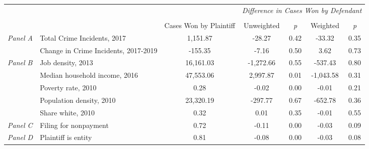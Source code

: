 \begin{tabular}{llccccc}
\toprule
 &  & \textit{} & \multicolumn{4}{c}{\textit{Difference in Cases Won by Defendant}} \\
\cline{4-7}
\\
 &  & Cases Won by Plaintiff & Unweighted & \emph{p} & Weighted & \emph{p} \\
\midrule
\multirow[c]{2}{.75cm}{\textit{Panel A}} & Total Crime Incidents, 2017 & 1,151.87 & -28.27 & 0.42 & -33.32 & 0.35 \\
 & Change in Crime Incidents, 2017-2019 & -155.35 & -7.16 & 0.50 & 3.62 & 0.73 \\
\cline{1-7}
\multirow[c]{5}{.75cm}{\textit{Panel B}} & Job density, 2013 & 16,161.03 & -1,272.66 & 0.55 & -537.43 & 0.80 \\
 & Median household income, 2016 & 47,553.06 & 2,997.87 & 0.01 & -1,043.58 & 0.31 \\
 & Poverty rate, 2010 & 0.28 & -0.02 & 0.00 & -0.01 & 0.21 \\
 & Population density, 2010 & 23,320.19 & -297.77 & 0.67 & -652.78 & 0.36 \\
 & Share white, 2010 & 0.32 & 0.01 & 0.35 & -0.01 & 0.55 \\
\cline{1-7}
\textit{Panel C} & Filing for nonpayment & 0.72 & -0.11 & 0.00 & -0.03 & 0.09 \\
\cline{1-7}
\textit{Panel D} & Plaintiff is entity & 0.81 & -0.08 & 0.00 & -0.03 & 0.08 \\
\cline{1-7}
\bottomrule
\end{tabular}
